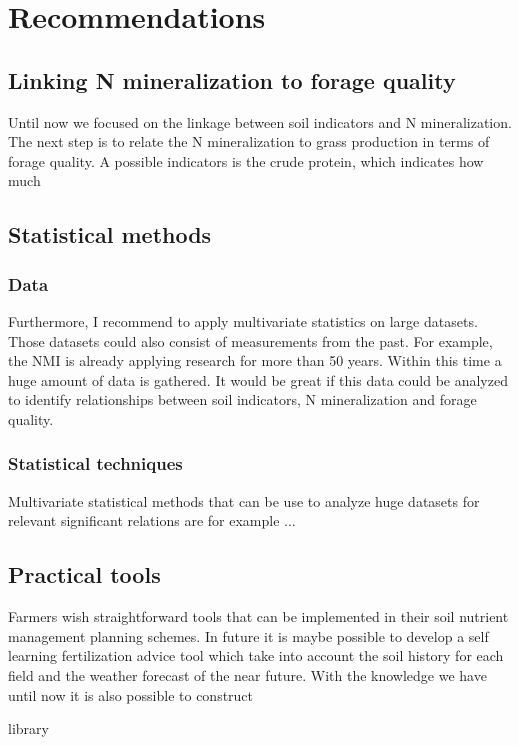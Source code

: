 \documentclass[10pt,twoside,dutch,english]{report}
\begin{document}
	
\chapter{Recommendations}
	\section{Linking N mineralization to forage quality}
Until now we focused on the linkage between soil indicators and N mineralization. The next step is to relate the N mineralization to grass production in terms of forage quality. A possible indicators is the crude protein, which indicates how much 

	 \section{Statistical methods}
	 \subsection{Data}
Furthermore, I recommend to apply multivariate statistics on large datasets. Those datasets could also consist of measurements from the past. For example, the NMI is already applying research for more than 50 years. Within this time a huge amount of data is gathered. It would be great if this data could be analyzed to identify relationships between soil indicators, N mineralization and forage quality. 
	\subsection{Statistical techniques}
	Multivariate statistical methods that can be use to analyze huge datasets for relevant significant relations are for example ...
	
	\section{Practical tools}
	Farmers wish straightforward tools that can be implemented in their soil nutrient management planning schemes. In future it is maybe possible to develop a self learning fertilization advice tool which take into account the soil history for each field and the weather forecast of the near future. With the knowledge we have until now it is also possible to construct
	




\footnotesize 

 {library}
\normalsize 
\end{document}
